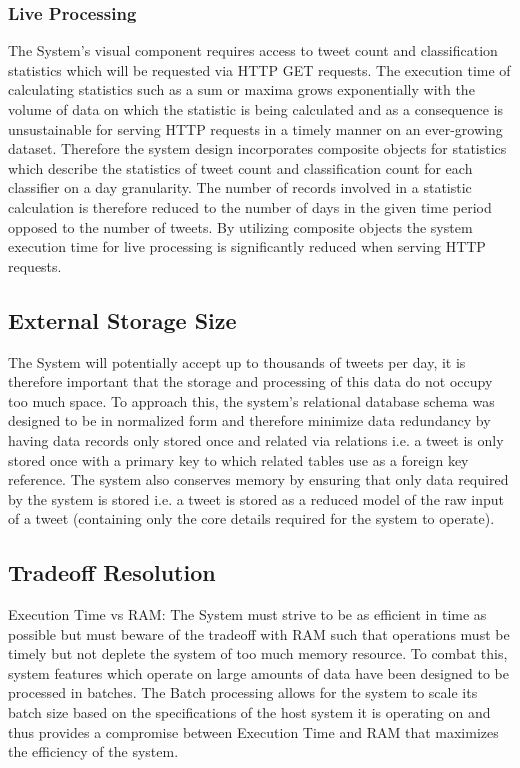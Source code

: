 \documentclass[11pt]{report}
\begin{document}
\subsubsection*{Live Processing}
The System's visual component requires access to tweet count and classification statistics which will be requested via HTTP GET requests. The execution time of calculating statistics such as a sum or maxima grows exponentially with the volume of data on which the statistic is being calculated and as a consequence is unsustainable for serving HTTP requests in a timely manner on an ever-growing dataset. Therefore the system design incorporates composite objects for statistics which describe the statistics of tweet count and classification count for each classifier on a day granularity. The number of records involved in a statistic calculation is therefore reduced to the number of days in the given time period opposed to the number of tweets. By utilizing composite objects the system execution time for live processing is significantly reduced when serving HTTP requests.

\subsection*{External Storage Size} 
The System will potentially accept up to thousands of tweets per day, it is therefore important that the storage and processing of this data do not occupy too much space. To approach this, the system's relational database schema was designed to be in normalized form and therefore minimize data redundancy by having data records only stored once and related via relations i.e. a tweet is only stored once with a primary key to which related tables use as a foreign key reference. The system also conserves memory by ensuring that only data required by the system is stored i.e. a tweet is stored as a reduced model of the raw input of a tweet (containing only the core details required for the system to operate).

\subsection*{Tradeoff Resolution} 

Execution Time vs RAM: The System must strive to be as efficient in time as possible but must beware of the tradeoff with RAM such that operations must be timely but not deplete the system of too much memory resource. To combat this, system features which operate on large amounts of data have been designed to be processed in batches. The Batch processing allows for the system to scale its batch size based on the specifications of the host system it is operating on and thus provides a compromise between Execution Time and RAM that maximizes the efficiency of the system.
\end{document}
